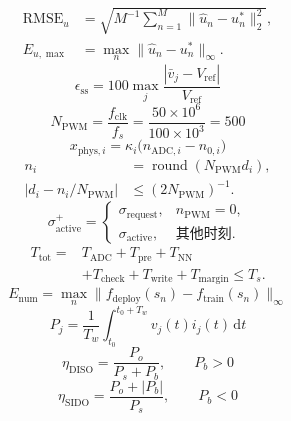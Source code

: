 \begin{equation}\begin{aligned}\mathrm{RMSE}_u&=\sqrt{M^{-1}\sum_{n=1}^{M}\|\hat u_n-u_n^*\|_2^2},\\ E_{u,\max}&=\max_n\|\hat u_n-u_n^*\|_\infty.\end{aligned}\end{equation}
\begin{equation}\epsilon_{\mathrm{ss}}=100\max_j\frac{|\bar v_j-V_{\mathrm{ref}}|}{V_{\mathrm{ref}}}\end{equation}
\begin{equation}N_{\mathrm{PWM}}=\frac{f_{\mathrm{clk}}}{f_s}=\frac{50\times10^6}{100\times10^3}=500\end{equation}
\begin{equation}x_{\mathrm{phys},i}=\kappa_i\bigl(n_{\mathrm{ADC},i}-n_{0,i}\bigr)\end{equation}
\begin{equation}\begin{aligned}n_i&=\operatorname{round}(N_{\mathrm{PWM}}d_i),\\ |d_i-n_i/N_{\mathrm{PWM}}|&\le (2N_{\mathrm{PWM}})^{-1}.\end{aligned}\end{equation}
\begin{equation}\sigma_{\mathrm{active}}^{+}=\begin{cases}\sigma_{\mathrm{request}},&n_{\mathrm{PWM}}=0,\\ \sigma_{\mathrm{active}},&\text{其他时刻}.\end{cases}\end{equation}
\begin{equation}\begin{aligned}T_{\mathrm{tot}}={}&T_{\mathrm{ADC}}+T_{\mathrm{pre}}+T_{\mathrm{NN}}\\ &+T_{\mathrm{check}}+T_{\mathrm{write}}+T_{\mathrm{margin}}\le T_s.\end{aligned}\end{equation}
\begin{equation}E_{\mathrm{num}}=\max_n\|f_{\mathrm{deploy}}(s_n)-f_{\mathrm{train}}(s_n)\|_\infty\end{equation}
\begin{equation}P_j=\frac{1}{T_w}\int_{t_0}^{t_0+T_w}v_j(t)i_j(t)\,\mathrm dt\end{equation}
\begin{equation}\eta_{\mathrm{DISO}}=\frac{P_o}{P_s+P_b},\qquad P_b>0\end{equation}
\begin{equation}\eta_{\mathrm{SIDO}}=\frac{P_o+|P_b|}{P_s},\qquad P_b<0\end{equation}